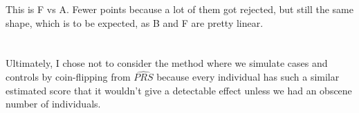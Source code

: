 \documentclass[11pt]{article} %
\begin{document}
This is F vs A. Fewer points because a lot of them got rejected, but still the same shape, which is to be expected, as B and F are pretty linear.

\section{}

Ultimately, I chose not to consider the method where we simulate cases and controls by coin-flipping from $\widehat{PRS}$ because every individual has such a similar estimated score that it wouldn't give a detectable effect unless we had an obscene number of individuals.
\end{document}
